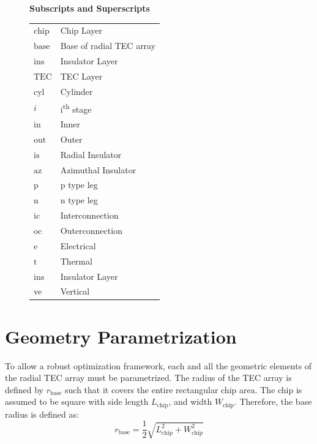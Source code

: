 \documentclass[10pt,a4paper,twocolumn]{article}
\begin{document}
\begin{figure}[H]
{{			\vspace{4pt}
			\textbf{Subscripts and Superscripts}\\[2pt]
			\begin{tabular}{@{}p{}p{}@{}}
				$\text{chip}$ & Chip Layer                  \\
				$\text{base}$ & Base of radial TEC array    \\
				$\text{ins}$  & Insulator Layer             \\
				$\text{TEC}$  & TEC Layer                   \\
				$\text{cyl}$  & Cylinder                    \\
				$i$           & i\textsuperscript{th} stage \\
				$\text{in}$   & Inner                       \\
				$\text{out}$  & Outer                       \\
				$\text{is}$   & Radial Insulator            \\
				$\text{az}$   & Azimuthal Insulator         \\
				$\text{p}$    & p type leg                  \\
				$\text{n}$    & n type leg                  \\
				$\text{ic}$   & Interconnection             \\
				$\text{oc}$   & Outerconnection             \\
				$\text{e}$    & Electrical                  \\
				$\text{t}$    & Thermal                     \\
				$\text{ins}$  & Insulator Layer             \\
				ve            & Vertical                    \\
			\end{tabular}
		}}
\end{figure}

\section{Geometry Parametrization}

To allow a robust optimization framework, each and all the geometric elements of the radial TEC array must be parametrized. The radius of the TEC array is defined by $r_{\text{base}}$ such that it covers the entire rectangular chip area. The chip is assumed to be square with side length $L_{\text{chip}}$, and width $W_{\text{chip}}$. Therefore, the base radius is defined as:
\begin{equation}
	r_{\text{base}} = \frac{1}{2}\sqrt{L_{\text{chip}}^2+W_{\text{chip}}^2}
\end{equation}
\end{document}
